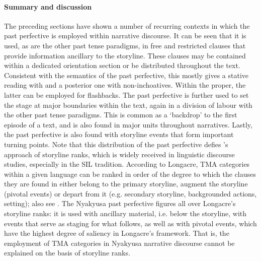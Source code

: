\paragraph{Summary and discussion}\label{PastPFVNarrativeDiscourseSummary}
The preceding sections have shown a number of recurring contexts in which the past perfective is employed within narrative discourse. It can be seen that it is used, as are the other past tense paradigms, in free and restricted clauses that provide information ancillary to the storyline. These clauses may be contained within a dedicated orientation section or be distributed throughout the text. Consistent with the semantics of the past perfective, this mostly gives a stative reading with  and a posterior one with non-inchoatives. Within the  proper, the latter can be employed for flashbacks. The past perfective is further used to set the stage at major boundaries within the text, again in a division of labour with the other past tense paradigms. This is common as a \lq backdrop' to the first episode of a text, and is also found in major units throughout narratives. Lastly, the past perfective is also found with storyline events that form important turning points.
Note that this distribution of the past perfective defies \citeauthor{LongacreR1990}'s approach of storyline ranks, which is widely received in linguistic discourse studies, especially in the SIL tradition. According to Longacre, TMA categories within a given language can be ranked  in order of the degree to which the clauses they are found in either belong to the primary storyline, augment the storyline (pivotal events) or depart from it (e.g. secondary storyline, backgrounded actions, setting); also see . The Nyakyusa past perfective figures all over Longacre's storyline ranks: it is used with ancillary material, i.e. below the storyline, with events that serve as staging for what follows, as well as with pivotal events, which have the highest degree of saliency in Longacre's framework. That is, the employment of TMA categories in Nyakyusa narrative discourse cannot be explained on the basis of storyline ranks.


